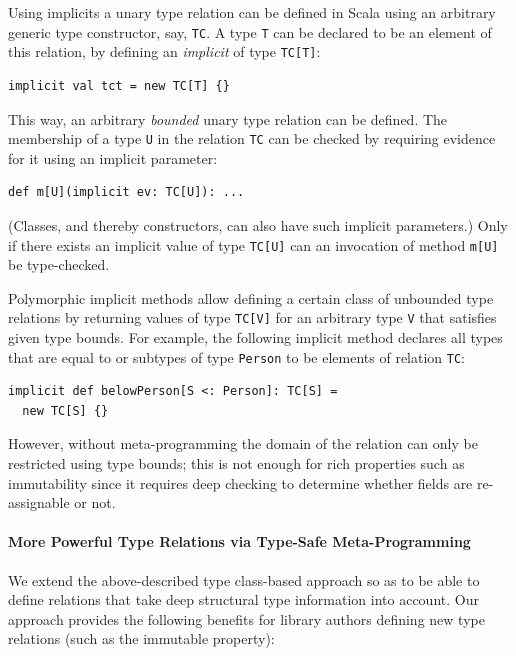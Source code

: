 \documentclass[preprint,nocopyrightspace]{sigplanconf}
\begin{document}
Using implicits a unary type relation can be defined in Scala using an arbitrary generic
type constructor, say, \verb|TC|. A type \verb|T| can be declared to be an element of this
relation, by defining an {\em implicit} of type \verb|TC[T]|:

\begin{lstlisting}
implicit val tct = new TC[T] {}
\end{lstlisting}
\noindent
This way, an arbitrary {\em bounded} unary type relation can be defined. The
membership of a type \verb|U| in the relation \verb|TC| can be checked by requiring evidence
for it using an implicit parameter:

\begin{lstlisting}
def m[U](implicit ev: TC[U]): ...
\end{lstlisting}
\noindent
(Classes, and thereby constructors, can also have such implicit parameters.)
Only if there exists an implicit value of type \verb|TC[U]| can an invocation
of method \verb|m[U]| be type-checked.

Polymorphic implicit methods allow defining a certain class of unbounded type
relations by returning values of type \verb|TC[V]| for an arbitrary type \verb|V| that satisfies
given type bounds. For example, the following implicit method declares all types that
are equal to or subtypes of type \verb|Person| to be elements of relation \verb|TC|:

\begin{lstlisting}
implicit def belowPerson[S <: Person]: TC[S] =
  new TC[S] {}
\end{lstlisting}
\noindent
However, without meta-programming the domain of the relation can only be
restricted using type bounds; this is not enough for rich properties such as
immutability since it requires deep checking to determine whether fields are
re-assignable or not.

\paragraph{More Powerful Type Relations via Type-Safe Meta-Programming}

We extend the above-described type class-based approach so as to be able to
define relations that take deep structural type information into account. Our
approach provides the following benefits for library authors defining new type
relations (such as the immutable property):
\end{document}
